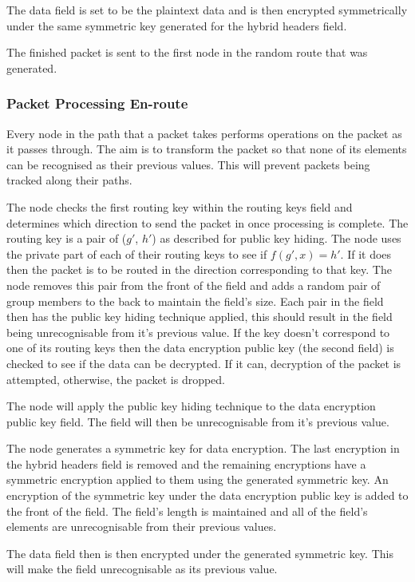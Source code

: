 \documentclass[ %
                    author={Luke Murray},
                supervisor={Dr. Simon Hollis},
                     title={Shadow Peer-to-Peer Networks},
                  subtitle={},
                    degree={MEng},
                      year={2013} ]{thesis}
\begin{document}
The data field is set to be the plaintext data and is then encrypted symmetrically under the same symmetric key generated for the hybrid headers field.

The finished packet is sent to the first node in the random route that was generated.

\subsubsection{Packet Processing En-route}

Every node in the path that a packet takes performs operations on the packet as it passes through. The aim is to transform the packet so that none of its elements can be recognised as their previous values. This will prevent packets being tracked along their paths.

The node checks the first routing key within the routing keys field and determines which direction to send the packet in once processing is complete. The routing key is a pair of ($g\prime$, $h\prime$) as described for public key hiding. The node uses the private part of each of their routing keys to see if $f(g\prime, x) = h\prime$. If it does then the packet is to be routed in the direction corresponding to that key. The node removes this pair from the front of the field and adds a random pair of group members to the back to maintain the field's size. Each pair in the field then has the public key hiding technique applied, this should result in the field being unrecognisable from it's previous value. If the key doesn't correspond to one of its routing keys then the data encryption public key (the second field) is checked to see if the data can be decrypted. If it can, decryption of the packet is attempted, otherwise, the packet is dropped.

The node will apply the public key hiding technique to the data encryption public key field. The field will then be unrecognisable from it's previous value.

The node generates a symmetric key for data encryption. The last encryption in the hybrid headers field is removed and the remaining encryptions have a symmetric encryption applied to them using the generated symmetric key. An encryption of the symmetric key under the data encryption public key is added to the front of the field. The field's length is maintained and all of the field's elements are unrecognisable from their previous values.

The data field then is then encrypted under the generated symmetric key. This will make the field unrecognisable as its previous value.
\end{document}
